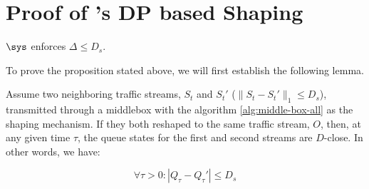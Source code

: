 \section{Proof of {\sys}'s DP based Shaping}
\label{appendix:dp}
\begin{proposition*}
  {$\sys$} enforces $\Delta \leq D_s$.
\end{proposition*}
To prove the proposition stated above, we will first establish the following lemma.
\begin{lemma}
Assume two neighboring traffic streams, $S_t$ and $S_t'$ ($\|S_t - S_t'\|_1 \leq D_s$), transmitted through a
middlebox with the algorithm \ref{alg:middle-box-all} as the shaping mechanism.
If they both reshaped to the same traffic stream, $O$, then,  at any given time
$\tau$, the queue states for the first and second streams are $D$-close.
In other words, we have:

\begin{equation}\label{equ:composition}
        \forall \tau > 0 : |Q_{\tau} - Q_{\tau}'| \leq D_s
\end{equation}
\end{lemma}

